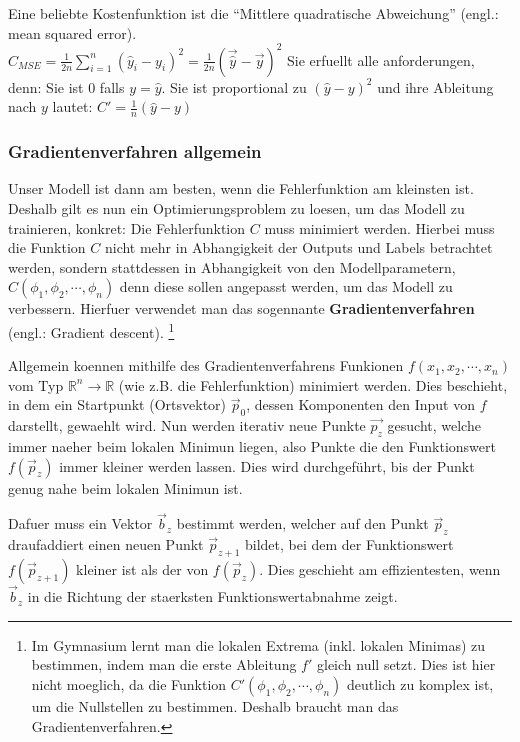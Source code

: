\documentclass[../main]{subfiles}
\begin{document}
Eine beliebte Kostenfunktion ist die ``Mittlere quadratische Abweichung'' (engl.: mean squared error).\\
$\displaystyle C_{MSE} = \frac{1}{2n}\sum_{i=1}^{n}(\hat{y}_i - y_i)^2 = \frac{1}{2n}(\vec{\hat{y}} - \vec{y})^2$
Sie erfuellt alle anforderungen, denn:
Sie ist $0$ falls $y=\hat{y}$. Sie ist proportional zu $(\hat{y}-y)^2$ und ihre Ableitung nach $y$ lautet: $C'=\frac{1}{n}(\hat{y}-y)$


\subsubsection{Gradientenverfahren allgemein}
Unser Modell ist dann am besten, wenn die Fehlerfunktion am kleinsten ist.
Deshalb gilt es nun ein Optimierungsproblem zu loesen, um das Modell zu trainieren, konkret: Die Fehlerfunktion $C$ muss minimiert werden.
Hierbei muss die Funktion $C$ nicht mehr in Abhangigkeit der Outputs und Labels betrachtet werden, sondern stattdessen in Abhangigkeit von den Modellparametern,
$C(\phi_1, \phi_2, \cdots, \phi_n)$ denn diese sollen angepasst werden, um das Modell zu verbessern.
Hierfuer verwendet man das sogennante \textbf{Gradientenverfahren} (engl.: Gradient descent).
\footnote{
    Im Gymnasium lernt man die lokalen Extrema (inkl. lokalen Minimas) zu bestimmen, indem man die erste Ableitung $f'$ gleich null setzt.
    Dies ist hier nicht moeglich, da die Funktion $C'(\phi_1,\phi_2, \cdots, \phi_n)$ deutlich zu komplex ist, um die Nullstellen zu bestimmen. Deshalb braucht man das Gradientenverfahren.
}\par
\medskip
Allgemein koennen mithilfe des Gradientenverfahrens Funkionen $f(x_1, x_2, \cdots, x_n)$ vom Typ $\mathbb{R}^n \to \mathbb{R}$ (wie z.B. die Fehlerfunktion) minimiert werden.
Dies beschieht, in dem ein Startpunkt (Ortsvektor) $\vec{p}_0$, dessen Komponenten den Input von $f$ darstellt, gewaehlt wird.
Nun werden iterativ neue Punkte $\vec{p_z}$ gesucht, welche immer naeher beim lokalen Minimun liegen, also Punkte die den Funktionswert $f(\vec{p}_z)$ immer kleiner werden lassen.
Dies wird durchgeführt, bis der Punkt genug nahe beim lokalen Minimun ist.
\par
\medskip
Dafuer muss ein Vektor $\vec{b}_z$ bestimmt werden, welcher auf den Punkt $\vec{p}_z$ draufaddiert einen neuen Punkt $\vec{p}_{z+1}$ bildet,
bei dem der Funktionswert $f(\vec{p}_{z+1})$ kleiner ist als der von $f(\vec{p}_z)$.
Dies geschieht am effizientesten, wenn $\vec{b}_z$ in die Richtung der staerksten Funktionswertabnahme zeigt.
\end{document}
